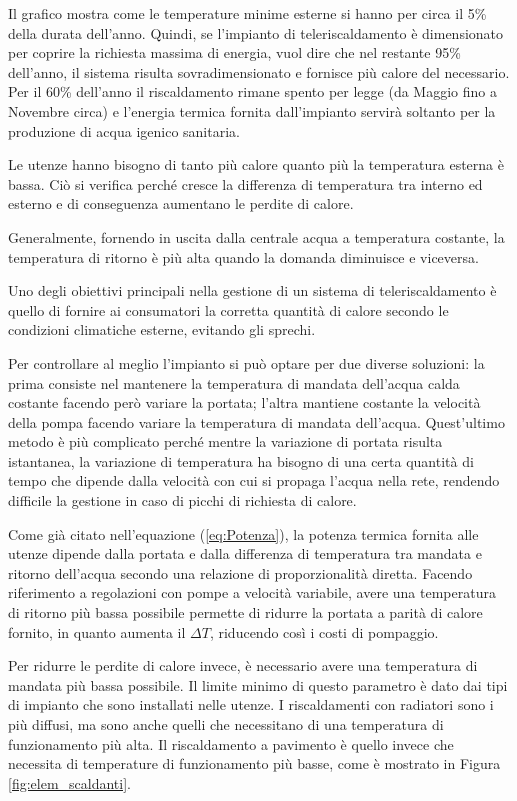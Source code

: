 \documentclass[laurea,oneside,11pt]{USiena_tesiLM3}
\begin{document}
 Il grafico mostra come le temperature minime esterne si hanno per circa il 5\% della durata dell'anno. Quindi, se l'impianto di teleriscaldamento è dimensionato per coprire la richiesta massima di energia, vuol dire che nel restante 95\% dell'anno, il sistema risulta sovradimensionato e fornisce più calore del necessario.  Per il 60\% dell'anno il riscaldamento rimane spento per legge (da Maggio fino a Novembre circa) e l'energia termica fornita dall'impianto servirà soltanto per la produzione di acqua igenico sanitaria.

Le utenze hanno bisogno di tanto più calore quanto più la temperatura esterna è bassa. Ciò si verifica perché cresce la differenza di temperatura tra interno ed esterno e di conseguenza aumentano le perdite di calore. 

Generalmente, fornendo in uscita dalla centrale  acqua a temperatura costante, la temperatura di ritorno è più alta quando la domanda diminuisce e viceversa.

Uno degli obiettivi principali nella gestione di un sistema di teleriscaldamento è quello  di fornire ai consumatori la corretta quantità di calore secondo le condizioni climatiche esterne,  evitando gli sprechi.

Per controllare al meglio l'impianto si può optare per due diverse soluzioni: la prima consiste nel mantenere la temperatura di mandata dell'acqua calda costante facendo però variare la portata; l'altra mantiene costante la velocità della pompa facendo variare la temperatura di mandata dell'acqua. Quest'ultimo metodo è più complicato perché mentre la variazione di portata risulta istantanea, la variazione di temperatura ha bisogno di una certa quantità di tempo  che dipende dalla velocità con cui si propaga l'acqua nella rete, rendendo difficile la gestione in caso di picchi di richiesta di calore. 

Come già citato nell'equazione (\ref{eq:Potenza}), la potenza termica fornita alle utenze dipende dalla portata e dalla differenza di temperatura tra mandata e ritorno dell'acqua secondo una relazione di proporzionalità diretta. Facendo riferimento a regolazioni con pompe a velocità variabile, avere una temperatura di ritorno più bassa possibile permette di ridurre la portata a parità di calore fornito, in quanto aumenta il $\Delta T$, riducendo così i costi di pompaggio.

Per ridurre le perdite di calore invece, è necessario avere una temperatura di mandata più bassa possibile. Il limite minimo di questo parametro è dato dai tipi di impianto che sono installati nelle utenze. I riscaldamenti con radiatori sono i più diffusi, ma sono anche quelli che necessitano di una temperatura di funzionamento più alta. Il riscaldamento a pavimento è quello invece che necessita di temperature di funzionamento più basse, come è mostrato in Figura \ref{fig:elem_scaldanti}. 
\end{document}
